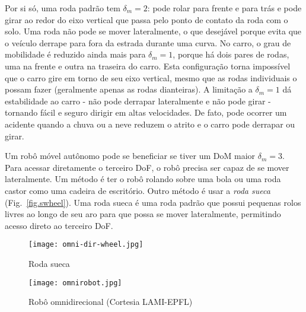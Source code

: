Por si só, uma roda padrão tem $\delta_m=2$: pode rolar para frente e para trás e pode girar ao redor do eixo vertical que passa pelo ponto de contato da roda com o solo. Uma roda não pode se mover lateralmente, o que desejável porque evita que o veículo derrape para fora da estrada durante uma curva. No carro, o grau de mobilidade é reduzido ainda mais para $\delta_m=1$, porque há dois pares de rodas, uma na frente e outra na traseira do carro. Esta configuração torna impossível que o carro gire em torno de seu eixo vertical, mesmo que as rodas individuais o possam fazer (geralmente apenas as rodas dianteiras). A limitação a $\delta_m=1$ dá estabilidade ao carro - não pode derrapar lateralmente e não pode girar - tornando fácil e seguro dirigir em altas velocidades. De fato, pode ocorrer um acidente quando a chuva ou a neve reduzem o atrito e o carro pode derrapar ou girar.

Um robô móvel autônomo pode se beneficiar se tiver um DoM maior $\delta_m = 3$. Para acessar diretamente o terceiro DoF, o robô precisa ser capaz de se mover lateralmente. Um método é ter o robô rolando sobre uma bola ou uma roda castor como uma cadeira de escritório. Outro método é usar a \emph{roda sueca} (Fig.~\ref{fig.swheel}). Uma roda sueca é uma roda padrão que possui pequenas rolos livres ao longo de seu aro para que possa se mover lateralmente, permitindo acesso direto ao terceiro DoF.

\begin{figure}
\begin{minipage}{.45\textwidth}
\texttt{[image: omni-dir-wheel.jpg]}
\caption{Roda sueca}\label{fig.swheel}
\end{minipage}
\hspace{\fill}
\begin{minipage}{.45\textwidth}\texttt{[image: omnirobot.jpg]}
\caption{Robô omnidirecional (Cortesia LAMI-EPFL)}\label{fig.omni-robot}
\end{minipage}
\end{figure}




